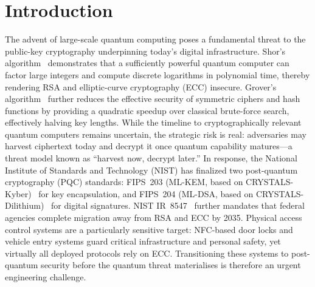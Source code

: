\section{Introduction}

The advent of large-scale quantum computing poses a fundamental threat to the
public-key cryptography underpinning today's digital infrastructure.
Shor's algorithm~\cite{SIAM:Shor97} demonstrates that a sufficiently powerful
quantum computer can factor large integers and compute discrete logarithms in
polynomial time, thereby rendering RSA and elliptic-curve cryptography (ECC)
insecure.
Grover's algorithm~\cite{STOC:Grover96} further reduces the effective security
of symmetric ciphers and hash functions by providing a quadratic speedup over
classical brute-force search, effectively halving key lengths.
While the timeline to cryptographically relevant quantum computers remains
uncertain, the strategic risk is real: adversaries may harvest ciphertext today
and decrypt it once quantum capability matures—a threat model known as
``harvest now, decrypt later.''
In response, the National Institute of Standards and Technology (NIST) has
finalized two post-quantum cryptography (PQC) standards: FIPS~203 (ML-KEM,
based on CRYSTALS-Kyber)~\cite{NIST:FIPS203} for key encapsulation, and
FIPS~204 (ML-DSA, based on CRYSTALS-Dilithium)~\cite{NIST:FIPS204} for digital
signatures.
NIST IR~8547~\cite{NIST:IR8547} further mandates that federal agencies complete
migration away from RSA and ECC by 2035.
Physical access control systems are a particularly sensitive target: NFC-based
door locks and vehicle entry systems guard critical infrastructure and personal
safety, yet virtually all deployed protocols rely on ECC.
Transitioning these systems to post-quantum security before the quantum threat
materialises is therefore an urgent engineering challenge.

